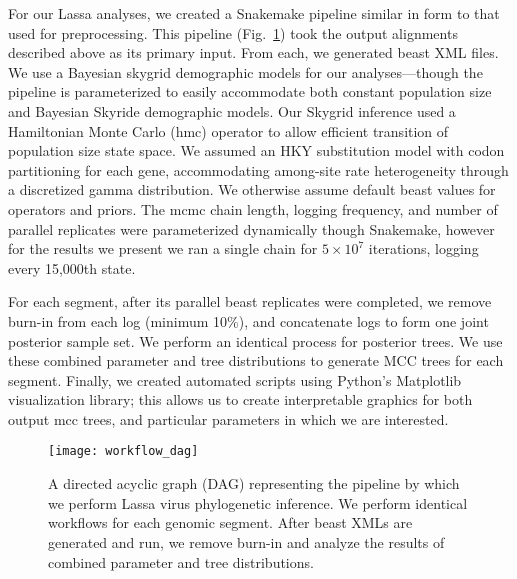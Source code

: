 For our Lassa analyses, we created a Snakemake pipeline similar in form to that used for preprocessing.
This pipeline (Fig.~\ref{fig:workflow_dag}) took the output alignments described above as its primary input.
From each, we generated \gls{beast} XML files.
We use a Bayesian skygrid demographic models for our analyses---though the pipeline is parameterized to easily accommodate both constant population size and Bayesian Skyride demographic models.
Our Skygrid inference used a Hamiltonian Monte Carlo (\gls{hmc}) operator to allow efficient transition of population size state space\cite{baele2020hamiltonian}.
We assumed an HKY substitution model with codon partitioning for each gene, accommodating among-site rate heterogeneity through a discretized gamma distribution.
We otherwise assume default \gls{beast} values for operators and priors.
The \gls{mcmc} chain length, logging frequency, and number of parallel replicates were parameterized dynamically though Snakemake, however for the results we present we ran a single chain for $5\times10^7$ iterations, logging every 15,000th state.

For each segment, after its parallel \gls{beast} replicates were completed, we remove burn-in from each log (minimum 10\%), and concatenate logs to form one joint posterior sample set.
We perform an identical process for posterior trees.
We use these combined parameter and tree distributions to generate MCC trees for each segment.
Finally, we created automated scripts using Python's Matplotlib\cite{hunter2007matplotlib} visualization library; this allows us to create interpretable graphics for both output \gls{mcc} trees, and particular parameters in which we are interested.

\begin{figure}[ht]
  \centering
  \medskip
  \texttt{[image: workflow\_dag]}
  \caption[Lassa phylogenetics pipeline]{A directed acyclic graph (DAG) representing the pipeline by which we perform Lassa virus phylogenetic inference. We perform identical workflows for each genomic segment. After \gls{beast} XMLs are generated and run, we remove burn-in and analyze the results of combined parameter and tree distributions.}
  \label{fig:workflow_dag}
\end{figure}

